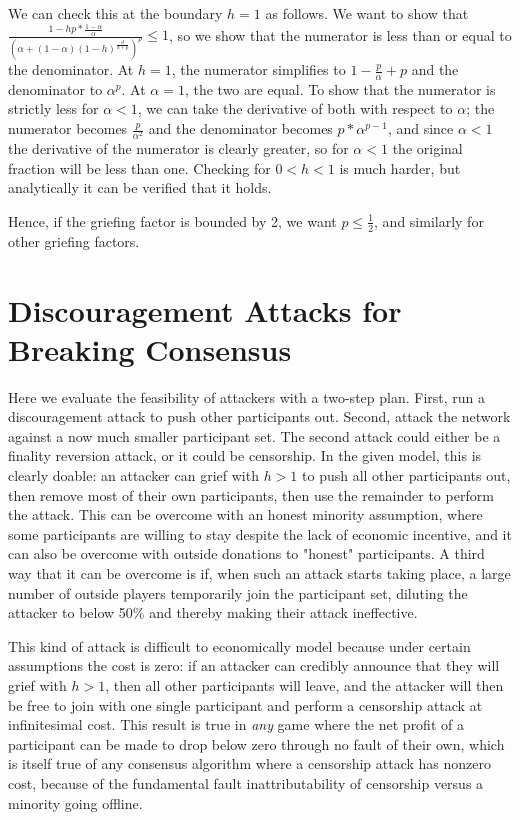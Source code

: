 \documentclass[12pt]{article}
\begin{document}
We can check this at the boundary $h = 1$ as follows. We want to show that $\frac{1 - hp * \frac{1-\alpha}{\alpha}}{(\alpha + (1-\alpha)(1-h)^{\frac{d}{d+p}})^p} \le 1$, so we show that the numerator is less than or equal to the denominator. At $h = 1$, the numerator simplifies to $1 - \frac{p}{\alpha} + p$ and the denominator to $\alpha^p$. At $\alpha=1$, the two are equal. To show that the numerator is strictly less for $\alpha<1$, we can take the derivative of both with respect to $\alpha$; the numerator becomes $\frac{p}{\alpha^2}$ and the denominator becomes $p * \alpha^{p-1}$, and since $\alpha < 1$ the derivative of the numerator is clearly greater, so for $\alpha < 1$ the original fraction will be less than one. Checking for $0 < h < 1$ is much harder, but analytically it can be verified that it holds.

Hence, if the griefing factor is bounded by 2, we want $p \le \frac{1}{2}$, and similarly for other griefing factors.


\section{Discouragement Attacks for Breaking Consensus}

Here we evaluate the feasibility of attackers with a two-step plan. First, run a discouragement attack to push other participants out. Second, attack the network against a now much smaller participant set. The second attack could either be a finality reversion attack, or it could be censorship. In the given model, this is clearly doable: an attacker can grief with $h > 1$ to push all other participants out, then remove most of their own participants, then use the remainder to perform the attack. This can be overcome with an honest minority assumption, where some participants are willing to stay despite the lack of economic incentive, and it can also be overcome with outside donations to "honest" participants. A third way that it can be overcome is if, when such an attack starts taking place, a large number of outside players temporarily join the participant set, diluting the attacker to below 50\% and thereby making their attack ineffective.

This kind of attack is difficult to economically model because under certain assumptions the cost is zero: if an attacker can credibly announce that they will grief with $h > 1$, then all other participants will leave, and the attacker will then be free to join with one single participant and perform a censorship attack at infinitesimal cost. This result is true in \textit{any} game where the net profit of a participant can be made to drop below zero through no fault of their own, which is itself true of any consensus algorithm where a censorship attack has nonzero cost, because of the fundamental fault inattributability of censorship versus a minority going offline.
\end{document}
